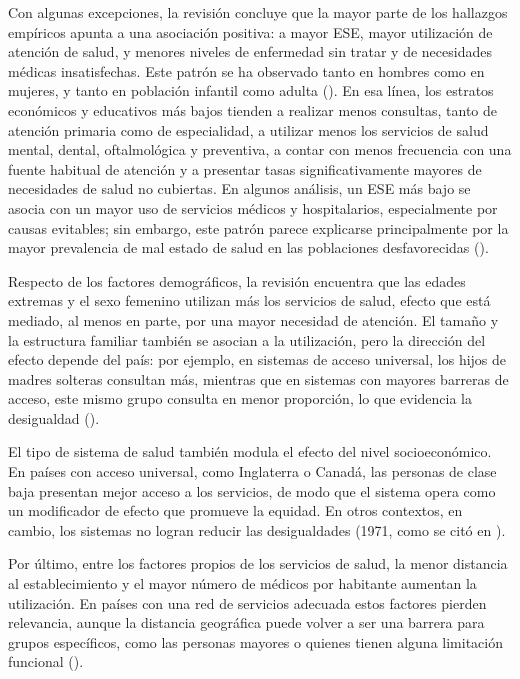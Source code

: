 \documentclass[
  spanish,
  a4paper,
  oneside]{scrbook}
\begin{document}
Con algunas excepciones, la revisión concluye que la mayor parte de los
hallazgos empíricos apunta a una asociación positiva: a mayor ESE, mayor
utilización de atención de salud, y menores niveles de enfermedad sin
tratar y de necesidades médicas insatisfechas. Este patrón se ha
observado tanto en hombres como en mujeres, y tanto en población
infantil como adulta (). En esa línea, los estratos económicos y educativos más bajos
tienden a realizar menos consultas, tanto de atención primaria como de
especialidad, a utilizar menos los servicios de salud mental, dental,
oftalmológica y preventiva, a contar con menos frecuencia con una fuente
habitual de atención y a presentar tasas significativamente mayores de
necesidades de salud no cubiertas. En algunos análisis, un ESE más bajo
se asocia con un mayor uso de servicios médicos y hospitalarios,
especialmente por causas evitables; sin embargo, este patrón parece
explicarse principalmente por la mayor prevalencia de mal estado de
salud en las poblaciones desfavorecidas
().

Respecto de los factores demográficos, la revisión encuentra que las
edades extremas y el sexo femenino utilizan más los servicios de salud,
efecto que está mediado, al menos en parte, por una mayor necesidad de
atención. El tamaño y la estructura familiar también se asocian a la
utilización, pero la dirección del efecto depende del país: por ejemplo,
en sistemas de acceso universal, los hijos de madres solteras consultan
más, mientras que en sistemas con mayores barreras de acceso, este mismo
grupo consulta en menor proporción, lo que evidencia la desigualdad
().

El tipo de sistema de salud también modula el efecto del nivel
socioeconómico. En países con acceso universal, como Inglaterra o
Canadá, las personas de clase baja presentan mejor acceso a los
servicios, de modo que el sistema opera como un modificador de efecto
que promueve la equidad. En otros contextos, en cambio, los sistemas no
logran reducir las desigualdades (1971, como se citó en
).

Por último, entre los factores propios de los servicios de salud, la
menor distancia al establecimiento y el mayor número de médicos por
habitante aumentan la utilización. En países con una red de servicios
adecuada estos factores pierden relevancia, aunque la distancia
geográfica puede volver a ser una barrera para grupos específicos, como
las personas mayores o quienes tienen alguna limitación funcional
().
\end{document}
